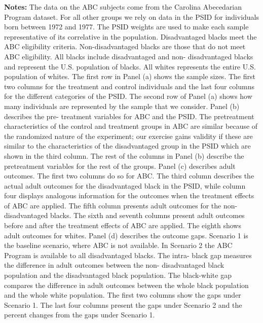 \begin{table}[htbp]
{{ {\bfseries Notes:} The data on the ABC  subjects come from the Carolina Abecedarian Program dataset. For all other  groups we rely on data in the PSID for individuals born between 1972 and 1977.   The PSID weights are used to make each sample representative  of its correlative in the population. Disadvantaged blacks meet the  ABC eligibility criteria. Non-disadvantaged blacks are those that do  not meet ABC eligibility. All blacks include disadvantaged and non- disadvantaged blacks and represent the U.S. population of blacks. All  whites represents the entire U.S. population of whites. The first row in  Panel (a) shows the sample sizes. The first two columns for the treatment  and control individuals and the last four columns for the different categories  of the PSID. The second row of Panel (a) shows how many individuals are  represented by the sample that we consider. Panel (b) describes the pre-  treatment variables for ABC and the PSID. The pretreatment characteristics  of the control and treatment groups in ABC are similar because of the  randomized nature of the experiment; our exercise gains validity if these  are similar to the characteristics of the disadvantaged group in the PSID  which are shown in the third column. The rest of the columns in Panel (b)  describe the pretreatment variables for the rest of the groups. Panel (c)  describes adult outcomes. The first two columns do so for ABC. The third column  describes the actual adult outcomes for the disadvantaged black in the PSID,  while column four displays analogous information for the outcomes when the  treatment effects of ABC are applied. The fifth column presents adult outcomes  for the non-disadvantaged blacks. The sixth and seventh columns present adult outcomes before  and after the treatment effects of ABC are applied. The  eighth shows adult outcomes for whites. Panel (d) describes the outcome gaps.  Scenario 1 is the baseline scenario, where ABC is not available. In Scenario 2  the ABC Program is available to all disadvantaged blacks. The intra- black gap measures the difference in adult outcomes between the non- disadvantaged black population and the disadvantaged black population.  The black-white gap compares the difference in adult outcomes between the  whole black population and the whole white population. The first two columns  show the gaps under Scenario 1. The last four columns present the gaps under  Scenario 2 and the percent changes from the gaps under Scenario 1. } } 
 \end{table}
